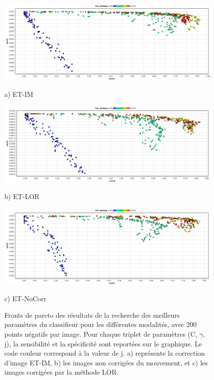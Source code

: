 \begin{figure}[h!]

\begin{center}
 \includegraphics[width=14cm]{images/pareto_mod_IM.png}

{\small a) ET-IM}
\vspace{0.5cm}

\includegraphics[width=14cm]{images/pareto_mod_LOR.png}
 
{\small b) ET-LOR}
\vspace{0.5cm}

\includegraphics[width=14cm]{images/pareto_mod_NoCorr.png}

{\small c) ET-NoCorr}

\end{center}
 \caption{\label{fig:paretoModalite} Fronts de pareto des résultats de la recherche des meilleurs paramètres du classifieur pour les différentes modalités, avec 200 points négatifs par image. Pour chaque triplet de paramètres (C, $\gamma$, j), la sensibilité et la spécificité sont reportées sur le graphique. Le code couleur correspond à la valeur de j. a) représente la correction d'image ET-IM, b) les images non corrigées du mouvement, et c) les images corrigées par la méthode LOR.}
\end{figure}








